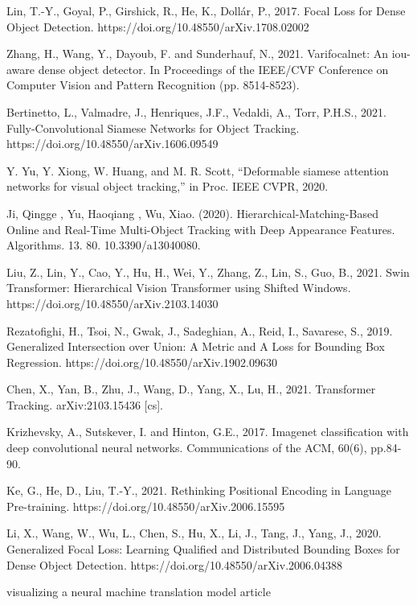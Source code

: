 \begin{thebibliography}{ widest-label }
	Lin, T.-Y., Goyal, P., Girshick, R., He, K., Dollár, P., 2017. Focal Loss for Dense Object Detection. https://doi.org/10.48550/arXiv.1708.02002
	
	Zhang, H., Wang, Y., Dayoub, F. and Sunderhauf, N., 2021. Varifocalnet: An iou-aware dense object detector. In Proceedings of the IEEE/CVF Conference on Computer Vision and Pattern Recognition (pp. 8514-8523).
	
	Bertinetto, L., Valmadre, J., Henriques, J.F., Vedaldi, A., Torr, P.H.S., 2021. Fully-Convolutional Siamese Networks for Object Tracking. https://doi.org/10.48550/arXiv.1606.09549
	
	Y. Yu, Y. Xiong, W. Huang, and M. R. Scott, “Deformable siamese attention networks for visual object tracking,” in Proc. IEEE CVPR, 2020.
	
	Ji, Qingge , Yu, Haoqiang , Wu, Xiao. (2020). Hierarchical-Matching-Based Online and Real-Time Multi-Object Tracking with Deep Appearance Features. Algorithms. 13. 80. 10.3390/a13040080. 
	
	Liu, Z., Lin, Y., Cao, Y., Hu, H., Wei, Y., Zhang, Z., Lin, S., Guo, B., 2021. Swin Transformer: Hierarchical Vision Transformer using Shifted Windows. https://doi.org/10.48550/arXiv.2103.14030
	
	Rezatofighi, H., Tsoi, N., Gwak, J., Sadeghian, A., Reid, I., Savarese, S., 2019. Generalized Intersection over Union: A Metric and A Loss for Bounding Box Regression. https://doi.org/10.48550/arXiv.1902.09630
	
	Chen, X., Yan, B., Zhu, J., Wang, D., Yang, X., Lu, H., 2021. Transformer Tracking. arXiv:2103.15436 [cs].
	
	Krizhevsky, A., Sutskever, I. and Hinton, G.E., 2017. Imagenet classification with deep convolutional neural networks. Communications of the ACM, 60(6), pp.84-90.
	
	Ke, G., He, D., Liu, T.-Y., 2021. Rethinking Positional Encoding in Language Pre-training. https://doi.org/10.48550/arXiv.2006.15595
	
	Li, X., Wang, W., Wu, L., Chen, S., Hu, X., Li, J., Tang, J., Yang, J., 2020. Generalized Focal Loss: Learning Qualified and Distributed Bounding Boxes for Dense Object Detection. https://doi.org/10.48550/arXiv.2006.04388
	
	visualizing a neural machine translation model article
	

\end{thebibliography}
